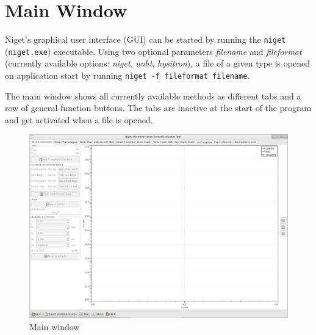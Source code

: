 \section{Main Window}

Niget's graphical user interface (GUI) can be started by running the \texttt{niget} (\texttt{niget.exe}) executable. Using two optional parameters \emph{filename} and \emph{fileformat} (currently available options: \emph{niget}, \emph{unht}, \emph{hysitron}), a file of a given type is opened on application start by running \texttt{niget -f fileformat filename}.

The main window shows all currently available methods as different tabs and a row of general function buttons. The tabs are inactive at the start of the program and get activated when a file is opened.

\begin{figure}[ht]
  \centering
  \includegraphics[width=\textwidth]{images/screen-main}
  \caption{Main window}
\end{figure}

